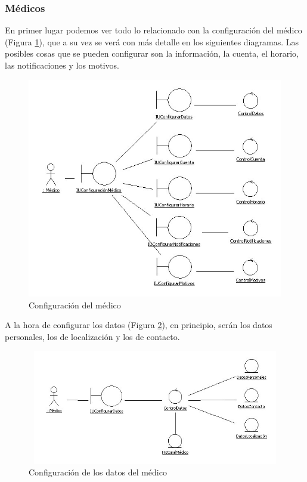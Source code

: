 \documentclass[a4paper,oneside,11pt]{book}
\begin{document}

	\newpage
	\subsubsection{Médicos} %
	\label{ssub:medicos}
	
		En primer lugar podemos ver todo lo relacionado con la configuración del médico (Figura \ref{fig:col_clase1}), que a su vez se verá con más detalle en los siguientes diagramas. Las posibles cosas que se pueden configurar son la información, la cuenta, el horario, las notificaciones y los motivos.
		\begin{figure}[H]
		  \centering
		    \includegraphics[width=16cm]{img/jpg/clases/1_MedicoConfiguracion.jpg}
		  \caption{Configuración del médico}
		  \label{fig:col_clase1}
		\end{figure}
		
		\newpage
		A la hora de configurar los datos (Figura \ref{fig:col_clase2}), en principio, serán los datos personales, los de localización y los de contacto.
		\begin{figure}[H]
		  \centering
		    \includegraphics[width=12cm, height=5cm]{img/jpg/clases/2_MedicosConfiguracionDatos.jpg}
		  \caption{Configuración de los datos del médico}
		  \label{fig:col_clase2}
		\end{figure}
\end{document}
